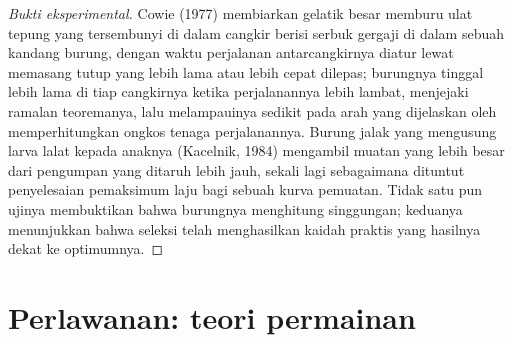 \begin{proof}[Bukti eksperimental]
Cowie (1977) membiarkan gelatik besar memburu ulat tepung yang tersembunyi di dalam cangkir
berisi serbuk gergaji di dalam sebuah kandang burung, dengan waktu perjalanan antarcangkirnya diatur
lewat memasang tutup yang lebih lama atau lebih cepat dilepas; burungnya tinggal
lebih lama di tiap cangkirnya ketika perjalanannya lebih lambat, menjejaki ramalan teoremanya,
lalu melampauinya sedikit pada arah yang dijelaskan oleh memperhitungkan
ongkos tenaga perjalanannya. Burung jalak yang mengusung larva lalat
kepada anaknya (Kacelnik, 1984) mengambil muatan yang lebih besar dari pengumpan
yang ditaruh lebih jauh, sekali lagi sebagaimana dituntut penyelesaian pemaksimum laju bagi sebuah
kurva pemuatan. Tidak satu pun ujinya membuktikan bahwa burungnya menghitung
singgungan; keduanya menunjukkan bahwa seleksi telah menghasilkan kaidah praktis yang
hasilnya dekat ke optimumnya.
\end{proof}

\section{Perlawanan: teori permainan}


